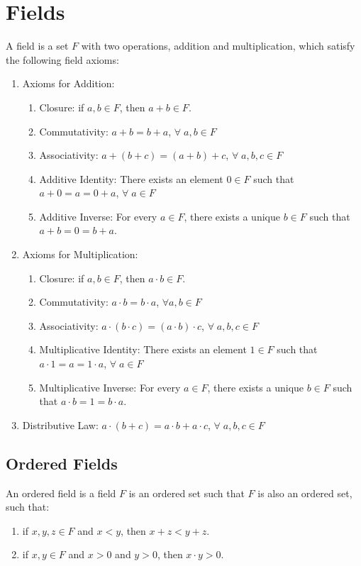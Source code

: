 \documentclass[12pt, oneside]{book}
\begin{document}
\section{Fields}
A field is a set \(F\) with two operations, addition and multiplication, which satisfy the following field axioms:
\begin{enumerate}
    \item Axioms for Addition:
    \begin{enumerate}
        \item Closure: if \(a,b \in F\), then \(a+b \in F\).
        \item Commutativity: \(a+b = b+a\), \(\forall \; a,b \in F\)
        \item Associativity: \(a+(b+c) = (a+b)+c\), \(\forall \; a,b,c \in F\)
        \item Additive Identity: There exists an element \(0 \in F\) such that \(a+0 = a = 0+a\), \(\forall \; a \in F\)
        \item Additive Inverse: For every \(a \in F\), there exists a unique \(b \in F\) such that \(a+b = 0 = b+a\).
    \end{enumerate}
    \item Axioms for Multiplication:
    \begin{enumerate}
        \item Closure: if \(a,b \in F\), then \(a \cdot b \in F\).
        \item Commutativity: \(a \cdot b = b \cdot a\), \(\forall a,b \in F\)
        \item Associativity: \(a \cdot (b \cdot c) = (a \cdot b) \cdot c\), \(\forall \; a,b,c \in F\)
        \item Multiplicative Identity: There exists an element \(1 \in F\) such that \(a \cdot 1 = a = 1 \cdot a\), \(\forall \; a \in F\)
        \item Multiplicative Inverse: For every \(a \in F\), there exists a unique \(b \in F\) such that \(a \cdot b = 1 = b \cdot a\).
    \end{enumerate}
    \item Distributive Law: \(a \cdot (b+c) = a \cdot b + a \cdot c\), \(\forall \; a,b,c \in F\)
\end{enumerate}

\subsection{Ordered Fields}
An ordered field is a field \(F\) is an ordered set such that \(F\) is also an ordered set, such that:
\begin{enumerate}
    \item if \(x,y,z \in F\) and \(x < y\), then \(x+z < y+z\).
    \item if \(x,y \in F\) and \(x > 0\) and \(y > 0\), then \(x \cdot y > 0\).
\end{enumerate}
\end{document}
